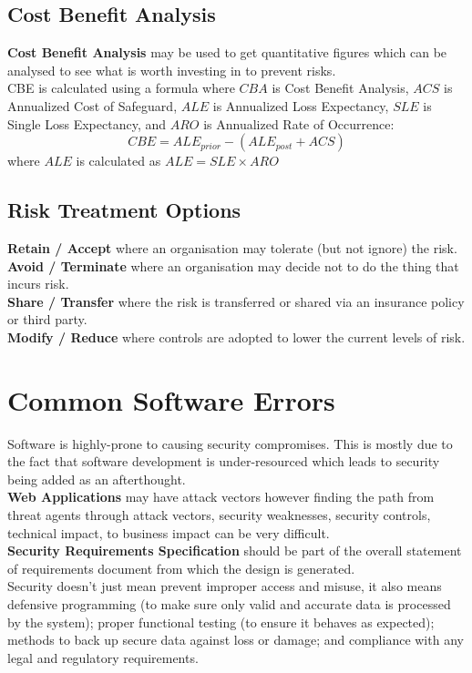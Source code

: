 \documentclass[a4paper,11pt]{article}
\begin{document}
\subsection{Cost Benefit Analysis}
\textbf{Cost Benefit Analysis} may be used to get quantitative figures which can be analysed to see what is worth investing in to prevent risks.\\
CBE is calculated using a formula where $CBA$ is Cost Benefit Analysis, $ACS$ is Annualized Cost of Safeguard, $ALE$ is Annualized Loss Expectancy, $SLE$ is Single Loss Expectancy, and $ARO$ is Annualized Rate of Occurrence:
\[CBE = ALE_{prior} - (ALE_{post} + ACS)\]
where $ALE$ is calculated as $ALE = SLE \times ARO$
\subsection{Risk Treatment Options}
\textbf{Retain / Accept} where an organisation may tolerate (but not ignore) the risk.\\
\textbf{Avoid / Terminate} where an organisation may decide not to do the thing that incurs risk.\\
\textbf{Share / Transfer} where the risk is transferred or shared via an insurance policy or third party.\\
\textbf{Modify / Reduce} where controls are adopted to lower the current levels of risk.

\section{Common Software Errors}
Software is highly-prone to causing security compromises. This is mostly due to the fact that software development is under-resourced which leads to security being added as an afterthought.\\
\textbf{Web Applications} may have attack vectors however finding the path from threat agents through attack vectors, security weaknesses, security controls, technical impact, to business impact can be very difficult.\\
\textbf{Security Requirements Specification} should be part of the overall statement of requirements document from which the design is generated.\\
Security doesn't just mean prevent improper access and misuse, it also means defensive programming (to make sure only valid and accurate data is processed by the system); proper functional testing (to ensure it behaves as expected); methods to back up secure data against loss or damage; and compliance with any legal and regulatory requirements.
\end{document}
